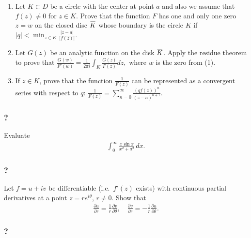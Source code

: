 \begin{enumerate}
\def\labelenumi{(\arabic{enumi})}
\item
  Let \(K\subset D\) be a circle with the center at point \(a\) and also
  we assume that \(f(z)\not =0\) for \(z\in K\). Prove that the function
  \(F\) has one and only one zero \(z=w\) on the closed disc
  \(\mkern 1.5mu\overline{\mkern-1.5muK\mkern-1.5mu}\mkern 1.5mu\) whose
  boundary is the circle \(K\) if
  \(\displaystyle{ |q|<\min_{z\in K} \frac{|z-a|}{|f(z)|}.}\)\\
\item
  Let \(G(z)\) be an analytic function on the disk
  \(\mkern 1.5mu\overline{\mkern-1.5muK\mkern-1.5mu}\mkern 1.5mu\).
  Apply the residue theorem to prove that
  \(\displaystyle{ \frac{G(w)}{F'(w)}=\frac{1}{2\pi i}\int_K \frac{G(z)}{F(z)} dz,}\)
  where \(w\) is the zero from (1).\\
\item
  If \(z\in K\), prove that the function
  \(\displaystyle{\frac{1}{F(z)}}\) can be represented as a convergent
  series with respect to \(q\):
  \(\displaystyle{ \frac{1}{F(z)}=\sum_{n=0}^{\infty} \frac{(qf(z))^n}{(z-a)^{n+1}}.}\)
\end{enumerate}

\hypertarget{section-90}{%
\subsubsection{?}\label{section-90}}

Evaluate
\begin{align*}\displaystyle{ \int_{0}^{\infty}\frac{x\sin x}{x^2+a^2} \,
dx }.\end{align*}

\hypertarget{section-91}{%
\subsubsection{?}\label{section-91}}

Let \(f=u+iv\) be differentiable (i.e.~\(f'(z)\) exists) with continuous
partial derivatives at a point \(z=re^{i\theta}\), \(r\not= 0\). Show
that
\begin{align*}\frac{\partial u}{\partial r}=\frac{1}{r}\frac{\partial v}{\partial \theta},\quad
\frac{\partial v}{\partial r}=-\frac{1}{r}\frac{\partial u}{\partial \theta}.\end{align*}

\hypertarget{section-92}{%
\subsubsection{?}\label{section-92}}

